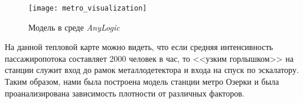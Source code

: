 \begin{figure}[h]
	\centering \texttt{[image: metro\_visualization]}
	\caption{Модель в среде \textit{AnyLogic}}
	\label{fig:metro_visualization}
\end{figure}

\newpage

На данной тепловой карте можно видеть, что если средняя интенсивность пассажиропотока составляет 2000 человек в час, то <<узким горлышком>> на станции служит вход до рамок металлодетектора и входа на спуск по эскалатору.\\

Таким образом, нами была построена модель станции метро Озерки и была проанализирована зависимость плотности от различных факторов.